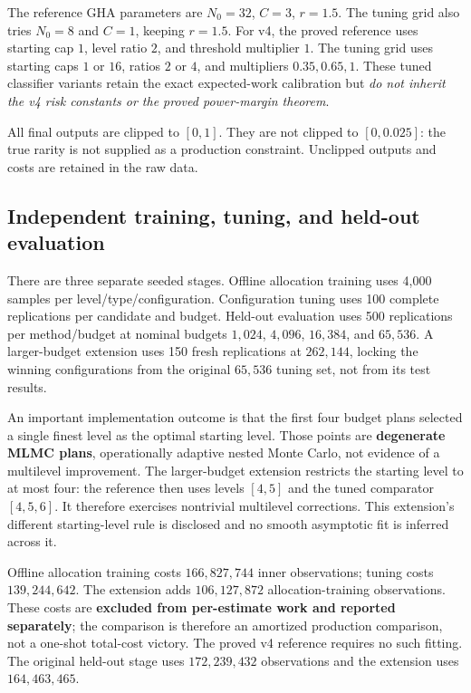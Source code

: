 \documentclass[11pt]{article}
\theoremstyle{definition}\newtheorem{conjecture}[theorem]{Conjecture}
\theoremstyle{remark}\newtheorem{remark}[theorem]{Remark}
\begin{document}
The reference GHA parameters are $N_0=32$, $C=3$, $r=1.5$. The tuning grid also tries $N_0=8$ and $C=1$, keeping $r=1.5$. For v4, the proved reference uses starting cap $1$, level ratio $2$, and threshold multiplier $1$. The tuning grid uses starting caps $1$ or $16$, ratios $2$ or $4$, and multipliers $0.35,0.65,1$. These tuned classifier variants retain the exact expected-work calibration but \emph{do not inherit the v4 risk constants or the proved power-margin theorem}.

All final outputs are clipped to $[0,1]$. They are not clipped to $[0,0.025]$: the true rarity is not supplied as a production constraint. Unclipped outputs and costs are retained in the raw data.

\subsection{Independent training, tuning, and held-out evaluation}
There are three separate seeded stages. Offline allocation training uses 4,000 samples per level/type/configuration. Configuration tuning uses 100 complete replications per candidate and budget. Held-out evaluation uses 500 replications per method/budget at nominal budgets $1{,}024$, $4{,}096$, $16{,}384$, and $65{,}536$. A larger-budget extension uses 150 fresh replications at $262{,}144$, locking the winning configurations from the original $65{,}536$ tuning set, not from its test results.

An important implementation outcome is that the first four budget plans selected a single finest level as the optimal starting level. Those points are \textbf{degenerate MLMC plans}, operationally adaptive nested Monte Carlo, not evidence of a multilevel improvement. The larger-budget extension restricts the starting level to at most four: the reference then uses levels $[4,5]$ and the tuned comparator $[4,5,6]$. It therefore exercises nontrivial multilevel corrections. This extension's different starting-level rule is disclosed and no smooth asymptotic fit is inferred across it.

Offline allocation training costs $166{,}827{,}744$ inner observations; tuning costs $139{,}244{,}642$. The extension adds $106{,}127{,}872$ allocation-training observations. These costs are \textbf{excluded from per-estimate work and reported separately}; the comparison is therefore an amortized production comparison, not a one-shot total-cost victory. The proved v4 reference requires no such fitting. The original held-out stage uses $172{,}239{,}432$ observations and the extension uses $164{,}463{,}465$.
\end{document}
